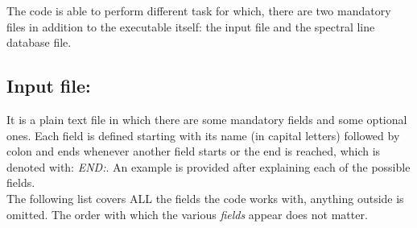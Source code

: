 %
\label{sect:execution}
%
The code is able to perform different task for which, there are two mandatory files in addition to the executable itself: the input file and the spectral line database file.
%
\subsection{Input file:}
It is a plain text file in which there are some mandatory fields and some optional ones. Each field is defined starting with its name (in capital letters) followed by colon and ends whenever another field starts or the end is reached, which is denoted with: {\it END:}. An example is provided after explaining each of the possible fields.\\

The following list covers ALL the fields the code works with, anything outside is omitted. The order with which the various {\it fields} appear does not matter.\\
